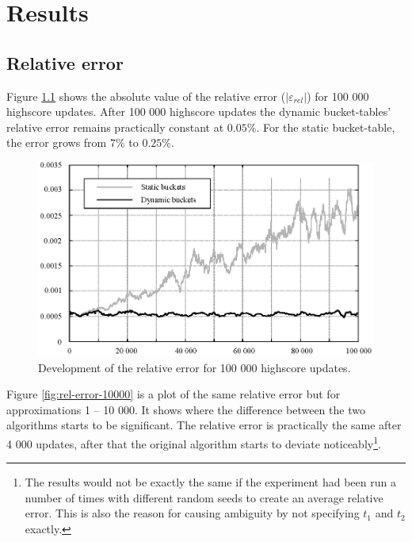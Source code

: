 \chapter{\label{results}Results}



\section{Relative error}

Figure \ref{fig:rel-error-100000} shows the absolute value of the relative error ($|\varepsilon_{rel}|$) for 100 000 highscore updates. After 100 000 highscore updates the dynamic bucket-tables' relative error remains practically constant at $0.05 \%$. For the static bucket-table, the error grows from $7 \%$ to $0.25 \%$.

\begin{figure}[h!]
  \centering
  \caption{Development of the relative error for 100 000 highscore updates.}
  \label{fig:rel-error-100000}
  \includegraphics[width=13cm]{img/rel-error-100000.eps}
\end{figure}

Figure \ref{fig:rel-error-10000} is a plot of the same relative error but for approximations 1 -- 10 000. It shows where the difference between the two algorithms starts to be significant. The relative error is practically the same after 4 000 updates, after that the original algorithm starts to deviate noticeably\footnote{The results would not be exactly the same if the experiment had been run a number of times with different random seeds to create an average relative error. This is also the reason for causing ambiguity by not specifying $t_1$ and $t_2$ exactly.}.



